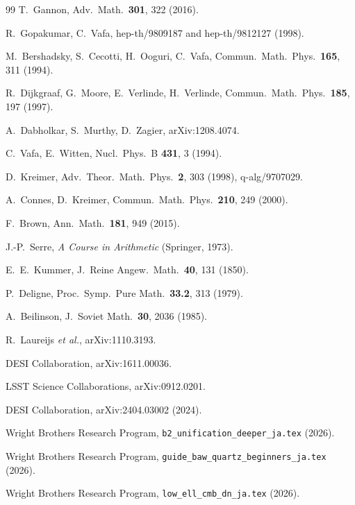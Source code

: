 \documentclass[11pt,a4paper]{article}
\begin{document}
\begin{thebibliography}{99}
T.~Gannon, Adv.\ Math.\ \textbf{301}, 322 (2016).

R.~Gopakumar, C.~Vafa, hep-th/9809187 and hep-th/9812127 (1998).

M.~Bershadsky, S.~Cecotti, H.~Ooguri, C.~Vafa,
Commun.\ Math.\ Phys.\ \textbf{165}, 311 (1994).

R.~Dijkgraaf, G.~Moore, E.~Verlinde, H.~Verlinde,
Commun.\ Math.\ Phys.\ \textbf{185}, 197 (1997).

A.~Dabholkar, S.~Murthy, D.~Zagier, arXiv:1208.4074.

C.~Vafa, E.~Witten, Nucl.\ Phys.\ B \textbf{431}, 3 (1994).

D.~Kreimer, Adv.\ Theor.\ Math.\ Phys.\ \textbf{2}, 303 (1998),
q-alg/9707029.

A.~Connes, D.~Kreimer, Commun.\ Math.\ Phys.\ \textbf{210}, 249 (2000).

F.~Brown, Ann.\ Math.\ \textbf{181}, 949 (2015).

J.-P.~Serre, \textit{A Course in Arithmetic} (Springer, 1973).

E.~E.~Kummer, J.\ Reine Angew.\ Math.\ \textbf{40}, 131 (1850).

P.~Deligne, Proc.\ Symp.\ Pure Math.\ \textbf{33.2}, 313 (1979).

A.~Beilinson, J.\ Soviet Math.\ \textbf{30}, 2036 (1985).

R.~Laureijs \textit{et al.}, arXiv:1110.3193.

DESI Collaboration, arXiv:1611.00036.

LSST Science Collaborations, arXiv:0912.0201.

DESI Collaboration, arXiv:2404.03002 (2024).

Wright Brothers Research Program, \texttt{b2\_unification\_deeper\_ja.tex} (2026).

Wright Brothers Research Program, \texttt{guide\_baw\_quartz\_beginners\_ja.tex} (2026).

Wright Brothers Research Program, \texttt{low\_ell\_cmb\_dn\_ja.tex} (2026).

\end{thebibliography}
\end{document}
